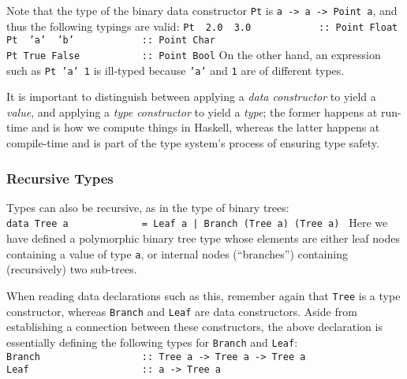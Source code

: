 Note that the type of the binary data constructor \mbox{\tt Pt} is \mbox{\tt a\ ->\ a\ ->\ Point\ a}, 
and thus the following typings are valid:
\bprog
\mbox{\tt Pt\ \ 2.0\ \ 3.0\ \ \ \ \ \ \ \ \ \ \ \ ::\ Point\ Float}\\
\mbox{\tt Pt\ \ 'a'\ \ 'b'\ \ \ \ \ \ \ \ \ \ \ \ ::\ Point\ Char}\\
\mbox{\tt Pt\ True\ False\ \ \ \ \ \ \ \ \ \ \ ::\ Point\ Bool}
\eprog
On the other hand, an expression such as \mbox{\tt Pt\ 'a'\ 1} is ill-typed
because \mbox{\tt 'a'} and \mbox{\tt 1} are of different types.

It is important to distinguish between applying a {\em data constructor} to
yield a {\em value}, and applying a {\em type constructor} to yield a
{\em type}; the former happens at run-time and is how we compute
things in Haskell, whereas the latter happens at compile-time and is
part of the type system's process of ensuring type safety.


\subsubsection{Recursive Types}
\label{tut-recursive-types}

Types can also be recursive, as in the type of binary trees:
\bprog
\mbox{\tt data\ Tree\ a\ \ \ \ \ \ \ \ \ \ \ \ \ =\ Leaf\ a\ |\ Branch\ (Tree\ a)\ (Tree\ a)\ }
\eprog
Here we have defined a polymorphic binary tree type whose elements
are either leaf nodes containing a value of type \mbox{\tt a}, or internal
nodes (``branches'') containing (recursively) two sub-trees.

When reading data declarations such as this, remember again that \mbox{\tt Tree} is a
type constructor, whereas \mbox{\tt Branch} and \mbox{\tt Leaf} are data constructors.
Aside from establishing a connection between these constructors, the
above declaration is essentially defining the following types for
\mbox{\tt Branch} and \mbox{\tt Leaf}:
\bprog
\mbox{\tt Branch\ \ \ \ \ \ \ \ \ \ \ \ \ \ \ \ \ \ ::\ Tree\ a\ ->\ Tree\ a\ ->\ Tree\ a}\\
\mbox{\tt Leaf\ \ \ \ \ \ \ \ \ \ \ \ \ \ \ \ \ \ \ \ ::\ a\ ->\ Tree\ a}
\eprog 

